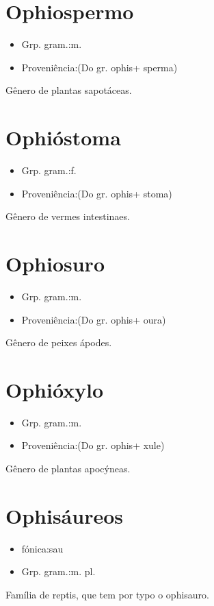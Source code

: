 \section{Ophiospermo}
\begin{itemize}
\item {Grp. gram.:m.}
\end{itemize}
\begin{itemize}
\item {Proveniência:(Do gr. \textunderscore ophis\textunderscore  + \textunderscore sperma\textunderscore )}
\end{itemize}
Gênero de plantas sapotáceas.
\section{Ophióstoma}
\begin{itemize}
\item {Grp. gram.:f.}
\end{itemize}
\begin{itemize}
\item {Proveniência:(Do gr. \textunderscore ophis\textunderscore  + \textunderscore stoma\textunderscore )}
\end{itemize}
Gênero de vermes intestinaes.
\section{Ophiosuro}
\begin{itemize}
\item {Grp. gram.:m.}
\end{itemize}
\begin{itemize}
\item {Proveniência:(Do gr. \textunderscore ophis\textunderscore  + \textunderscore oura\textunderscore )}
\end{itemize}
Gênero de peixes ápodes.
\section{Ophióxylo}
\begin{itemize}
\item {Grp. gram.:m.}
\end{itemize}
\begin{itemize}
\item {Proveniência:(Do gr. \textunderscore ophis\textunderscore  + \textunderscore xule\textunderscore )}
\end{itemize}
Gênero de plantas apocýneas.
\section{Ophisáureos}
\begin{itemize}
\item {fónica:sau}
\end{itemize}
\begin{itemize}
\item {Grp. gram.:m. pl.}
\end{itemize}
Família de reptis, que tem por typo o ophisauro.
